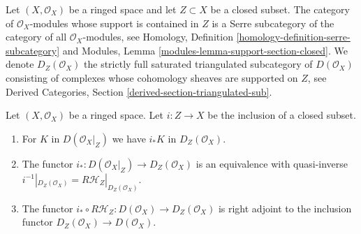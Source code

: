 \noindent
Let $(X, \mathcal{O}_X)$ be a ringed space and let $Z \subset X$
be a closed subset. The category of $\mathcal{O}_X$-modules whose
support is contained in $Z$ is a Serre subcategory of the
category of all $\mathcal{O}_X$-modules, see
Homology, Definition \ref{homology-definition-serre-subcategory}
and
Modules, Lemma \ref{modules-lemma-support-section-closed}.
We denote $D_Z(\mathcal{O}_X)$
the strictly full saturated triangulated subcategory of
$D(\mathcal{O}_X)$ consisting of complexes whose cohomology sheaves
are supported on $Z$, see
Derived Categories, Section \ref{derived-section-triangulated-sub}.

\begin{lemma}
\label{lemma-complexes-with-support-on-closed}
Let $(X, \mathcal{O}_X)$ be a ringed space. Let $i : Z \to X$ be the
inclusion of a closed subset.
\begin{enumerate}
\item For $K$ in $D(\mathcal{O}_X|_Z)$ we have $i_*K$ in $D_Z(\mathcal{O}_X)$.
\item The functor $i_* : D(\mathcal{O}_X|_Z) \to D_Z(\mathcal{O}_X)$
is an equivalence with quasi-inverse
$i^{-1}|_{D_Z(\mathcal{O}_X)} = R\mathcal{H}_Z|_{D_Z(\mathcal{O}_X)}$.
\item The functor
$i_* \circ R\mathcal{H}_Z : D(\mathcal{O}_X) \to D_Z(\mathcal{O}_X)$
is right adjoint to the inclusion functor
$D_Z(\mathcal{O}_X) \to D(\mathcal{O}_X)$.
\end{enumerate}
\end{lemma}

